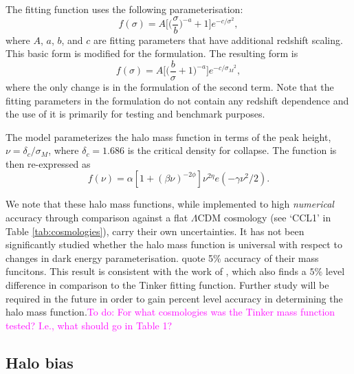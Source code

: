 \documentclass[\docopts]{\docclass}
\newcommand{\todo}[1]{\textcolor{magenta}{To do: #1}}
\begin{document}
The \citet{Tinker2008} fitting function uses the following parameterisation:
\begin{equation}
f(\sigma)=A\Big[\Big(\frac{\sigma}{b}\Big)^{-a}+1\Big]e^{-c/{\sigma}^2},
\end{equation}
where $A$, $a$, $b$, and $c$ are fitting parameters that have additional redshift scaling. This basic form is modified for the \citet{Angulo2012} formulation. The resulting form is
\begin{equation}
f(\sigma)=A\Big[\Big(\frac{b}{\sigma}+1\Big)^{-a}\Big]e^{-c/{\sigma_M}^2},
\end{equation}
where the only change is in the formulation of the second term. Note that the fitting parameters in the \citet{Angulo2012} formulation do not contain any redshift dependence and the use of it is primarily for testing and benchmark purposes.

The \citet{Tinker2010} model parameterizes the halo mass function in terms of the peak height, $\nu = \delta_c/\sigma_M$, where $\delta_c=1.686$ is the critical density for collapse. The function is then re-expressed as
\begin{equation}
  f(\nu) = \alpha[1+(\beta\nu)^{-2\phi}]\nu^{2\eta}e(-\gamma\nu^2/2).
\end{equation}

We note that these halo mass functions, while implemented to high {\em numerical} accuracy through comparison against a flat $\Lambda$CDM cosmology (see `CCL1' in Table  \ref{tab:cosmologies}), carry their own uncertainties. It has not been significantly studied whether the halo mass function is universal with respect to changes in dark energy parameterisation.
\citet{Tinker2008,Tinker2010} quote 5\% accuracy of their mass funcitons.
This result is consistent with the work of \citet{Watson2013}, which also finds a $5\%$ level difference in comparison to the Tinker fitting function. Further study will be required in the future in order to gain percent level accuracy in determining the halo mass function.\todo{For what cosmologies was the Tinker mass function tested? I.e., what should go in Table 1?}

\subsection{Halo bias}
\end{document}
